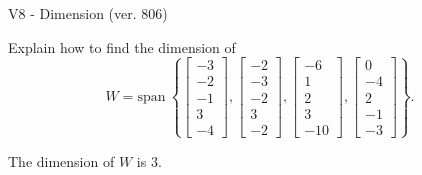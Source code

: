 \begin{exercise}
  \begin{exerciseTitle}V8 - Dimension (ver. 806)\end{exerciseTitle}
  \begin{exerciseStatement}
    Explain how to find the dimension of 
\[W=\mathrm{span}\ \left\{\left[\begin{array}{r}
-3 \\
-2 \\
-1 \\
3 \\
-4
\end{array}\right] , \left[\begin{array}{r}
-2 \\
-3 \\
-2 \\
3 \\
-2
\end{array}\right] , \left[\begin{array}{r}
-6 \\
1 \\
2 \\
3 \\
-10
\end{array}\right] , \left[\begin{array}{r}
0 \\
-4 \\
2 \\
-1 \\
-3
\end{array}\right]\right\}.\]



  \end{exerciseStatement}
  \begin{exerciseAnswer}
   The dimension of \(W\) is  \(3\).
  


  \end{exerciseAnswer}
\end{exercise}